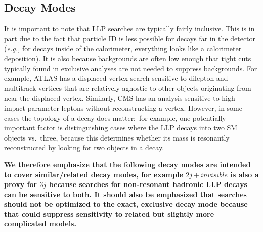 \subsection{Decay Modes}
It is important to note that LLP searches are typically fairly inclusive. This is in part due to the fact that particle ID is less possible for decays far in the detector (\emph{e.g.,} for decays inside of the calorimeter, everything looks like a calorimeter deposition). It is also because backgrounds are often low enough that tight cuts typically found in exclusive analyses are not needed to suppress backgrounds. For example, ATLAS has a displaced vertex search sensitive to dilepton and multitrack vertices that are relatively agnostic to other objects originating from near the displaced vertex. Similarly, CMS has an analysis sensitive to high-impact-parameter leptons without reconstructing a vertex.  However, in some cases the topology of a decay does matter:~for example, one potentially important factor is distinguishing cases where the LLP decays into two SM objects vs.~three, because this determines whether its mass is resonantly reconstructed by looking for two objects in a decay. 

{\bf We therefore emphasize that the following decay modes are intended to cover similar/related decay modes, for example $2j+invisible$ is also a proxy for $3j$ because searches for non-resonant hadronic LLP decays can be sensitive to both. It should also be emphasized that searches should not be optimized to the exact, exclusive decay mode because that could suppress sensitivity to related but slightly more complicated models.}

